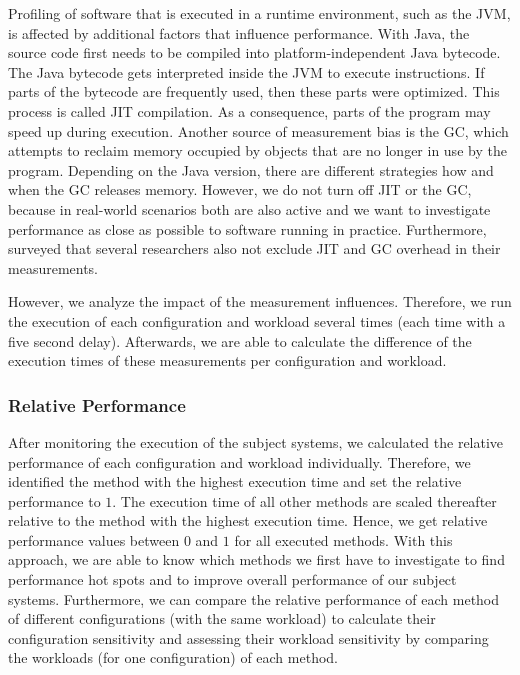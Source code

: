
Profiling of software that is executed in a runtime environment, such as the \ac{JVM}, is affected by additional factors that influence performance. With Java, the source code first needs to be compiled into platform-independent Java bytecode. The Java bytecode gets interpreted inside the \ac{JVM} to execute instructions. If parts of the bytecode are frequently used, then these parts were optimized. This process is called \ac{JIT} compilation. As a consequence, parts of the program may speed up during execution. Another source of measurement bias is the \ac{GC}, which attempts to reclaim memory occupied by objects that are no longer in use by the program. Depending on the Java version, there are different strategies how and when the \ac{GC} releases memory. However, we do not turn off \ac{JIT} or the \ac{GC}, because in real-world scenarios both are also active and we want to investigate performance as close as possible to software running in practice. Furthermore, \cite{georges2007statistically2} surveyed that several researchers also not exclude \ac{JIT} and \ac{GC} overhead in their measurements.

However, we analyze the impact of the measurement influences. Therefore, we run the execution of each configuration and workload several times (each time with a five second delay). Afterwards, we are able to calculate the difference of the execution times of these measurements per configuration and workload.


\subsubsection{Relative Performance}

After monitoring the execution of the subject systems, we calculated the relative performance of each configuration and workload individually. Therefore, we identified the method with the highest execution time and set the relative performance to $1$. The execution time of all other methods are scaled thereafter relative to the method with the highest execution time. Hence, we get relative performance values between $0$ and $1$ for all executed methods. With this approach, we are able to know which methods we first have to investigate to find performance hot spots and to improve overall performance of our subject systems. Furthermore, we can compare the relative performance of each method of different configurations (with the same workload) to calculate their configuration sensitivity and assessing their workload sensitivity by comparing the workloads (for one configuration) of each method.


